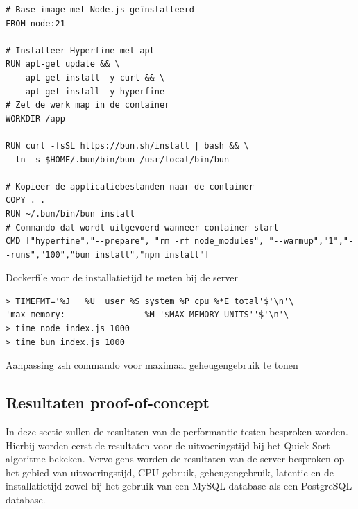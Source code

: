 \begin{listing}[H]
  \centering
  \begin{verbatim}
# Base image met Node.js geïnstalleerd
FROM node:21

# Installeer Hyperfine met apt
RUN apt-get update && \
    apt-get install -y curl && \
    apt-get install -y hyperfine
# Zet de werk map in de container
WORKDIR /app

RUN curl -fsSL https://bun.sh/install | bash && \
  ln -s $HOME/.bun/bin/bun /usr/local/bin/bun

# Kopieer de applicatiebestanden naar de container
COPY . .
RUN ~/.bun/bin/bun install
# Commando dat wordt uitgevoerd wanneer container start
CMD ["hyperfine","--prepare", "rm -rf node_modules", "--warmup","1","--runs","100","bun install","npm install"]
      \end{verbatim}
      \caption{\label{code:dockerinstall}Dockerfile voor de installatietijd te meten bij de server}
\end{listing}

\begin{listing}[H]
  \centering
  \begin{verbatim}
> TIMEFMT='%J   %U  user %S system %P cpu %*E total'$'\n'\
'max memory:                %M '$MAX_MEMORY_UNITS''$'\n'\
> time node index.js 1000
> time bun index.js 1000
      \end{verbatim}
      \caption{\label{code:zshmemory}Aanpassing zsh commando voor maximaal geheugengebruik te tonen}
\end{listing}

\subsection{Resultaten proof-of-concept}
In deze sectie zullen de resultaten van de performantie testen besproken worden.
Hierbij worden eerst de resultaten voor de uitvoeringstijd bij het Quick Sort algoritme bekeken.
Vervolgens worden de resultaten van de server besproken op het gebied van uitvoeringstijd, CPU-gebruik, geheugengebruik, latentie en de installatietijd
zowel bij het gebruik van een MySQL database als een PostgreSQL database.

